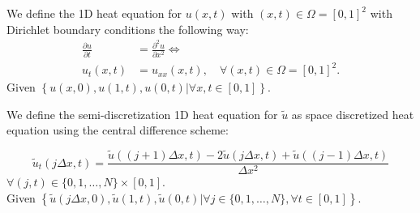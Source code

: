 \documentclass[a4paper,12pt]{article}
\begin{document}


\begin{definition} \label{def:heat equation square}
    We define the 1D heat equation for $u(x,t)$ with $ (x,t) \in \Omega = [0,1]^2$
    with Dirichlet boundary conditions the following way:
    \begin{align}
        \frac{\partial u}{\partial t} & = \frac{\partial^{2} u}{\partial x^{2}}  \Leftrightarrow   \\
        u_t(x,t)                      & = u_{xx}(x,t), \quad \forall (x,t) \in \Omega = [0,1]^2  .
    \end{align}
    Given $\left\{u(x,0),u(1,t),u(0,t) | \forall x,t \in [0,1]  \right\} $.
\end{definition}

\begin{definition} \label{def:discrete heat equation square}
    We define the semi-discretization 1D heat equation for $\tilde{u}$ as space discretized heat equation
    using the central difference scheme:

    \begin{equation}
        \tilde{u}_t(j \Delta x,t)  = \frac{\tilde{u}((j+1) \Delta x, t)-2\tilde{u}(j \Delta x, t)+\tilde{u}((j-1) \Delta x, t)}{\Delta x^{2}}
    \end{equation}
    $\forall (j,t) \in \{0, 1, \ldots, N\} \times [0,1]$. \\
    Given $\left\{\tilde{u}(j \Delta x,0),\tilde{u}(1,t),\tilde{u}(0,t) | \forall j \in \{0, 1, \ldots, N\}, \forall t \in  [0,1]  \right\} $.
\end{definition}
\end{document}
